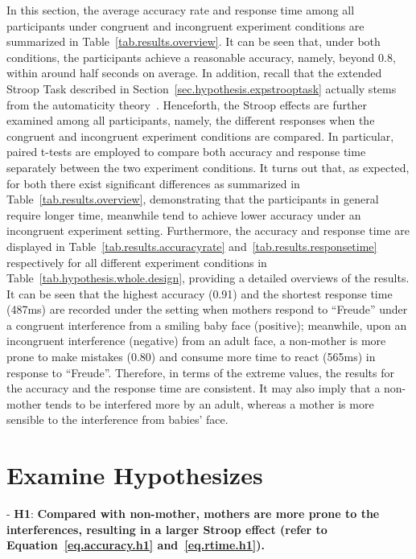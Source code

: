 In this section, the average accuracy rate and response time among all participants
under congruent and incongruent experiment conditions
are summarized in Table~\ref{tab.results.overview}.
It can be seen that, under both conditions,
the participants achieve a reasonable accuracy, namely, beyond $0.8$, within around half seconds on average.
In addition, 
recall that the extended Stroop Task described in Section~\ref{sec.hypothesis.expstrooptask} 
actually stems from the automaticity theory~\citep{monahan2001coloring}.
Henceforth,
the Stroop effects are further examined among all participants,
namely, the different responses when the congruent and incongruent experiment conditions
are compared.
In particular,
paired t-tests 
are employed to compare both accuracy and response time separately between the two experiment conditions.
It turns out that, as expected, for both there exist significant differences
as summarized in Table~\ref{tab.results.overview},
demonstrating that the participants in general require longer time,
meanwhile tend to achieve lower accuracy under an incongruent experiment setting.
Furthermore, the accuracy and response time are displayed in 
Table~\ref{tab.results.accuracyrate} and~\ref{tab.results.responsetime} respectively for all different experiment
conditions in Table~\ref{tab.hypothesis.whole.design},
providing a detailed overviews of the results.
It can be seen that
the highest accuracy (0.91) and the shortest response time (487ms)
are recorded under the setting when mothers respond to 
``Freude'' under
a congruent interference from a smiling baby face (positive);
meanwhile, 
upon an incongruent interference (negative)
from an adult face,
a non-mother 
is more prone to make mistakes (0.80) and consume more time to react (565ms) in response to ``Freude''.
Therefore, in terms of the extreme values, 
the results for the accuracy and the response time are 
consistent. It may also imply that 
a non-mother tends to be interfered more by an adult,
whereas a mother is more sensible to the interference from babies' face.


\section{Examine Hypothesizes}\label{sec.results.hypothesis}
\noindent - \textbf{H1}:
\textbf{Compared with non-mother, 
mothers are more prone to the interferences, resulting in a larger Stroop effect (refer to Equation~\ref{eq.accuracy.h1} and~\ref{eq.rtime.h1}).}

